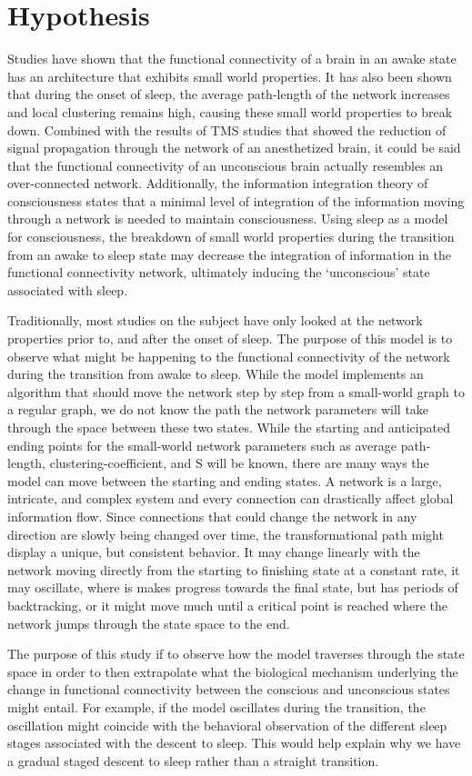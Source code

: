 \documentclass[11pt,letterpaper,doublespacing,titlepage]{article}
\begin{document}
\section{Hypothesis}
\par
Studies have shown that the functional connectivity of a brain in an awake state has an architecture that exhibits small world properties. It has also been shown that during the onset of sleep, the average path-length of the network increases and local clustering remains high, causing these small world properties to break down. Combined with the results of TMS studies that showed the reduction of signal propagation through the network of an anesthetized brain, it could be said that the functional connectivity of an unconscious brain actually resembles an over-connected network. Additionally, the information integration theory of consciousness states that a minimal level of integration of the information moving through a network is needed to maintain consciousness. Using sleep as a model for consciousness, the breakdown of small world properties during the transition from an awake to sleep state may decrease the integration of information in the functional connectivity network, ultimately inducing the ‘unconscious’ state associated with sleep.
\par
Traditionally, most studies on the subject have only looked at the network properties prior to, and after the onset of sleep. The purpose of this model is to observe what might be happening to the functional connectivity of the network during the transition from awake to sleep. While the model implements an algorithm that should move the network step by step from a small-world graph to a regular graph, we do not know the path the network parameters will take through the space between these two states. While the starting and anticipated ending points for the small-world network parameters such as average path-length, clustering-coefficient, and S will be known, there are many ways the model can move between the starting and ending states. A network is a large, intricate, and complex system and every connection can drastically affect global information flow. Since connections that could change the network in any direction are slowly being changed over time, the transformational path might display a unique, but consistent behavior. It may change linearly with the network moving directly from the starting to  finishing state at a constant rate, it may oscillate, where is makes progress towards the final state, but has periods of backtracking, or it might move much until a critical point is reached where the network jumps through the state space to the end. 
\par
The purpose of this study if to observe how the model traverses through the state space in order to then extrapolate what the biological mechanism underlying the change in functional  connectivity between the conscious and unconscious states might entail. For example, if the model oscillates during the transition, the oscillation might coincide with the behavioral observation of the different sleep stages associated with the descent to sleep. This would help explain why we have a gradual staged descent to sleep rather than a straight transition. 
\end{document}
